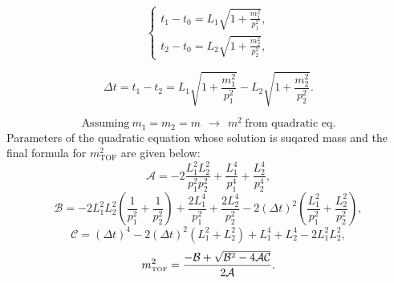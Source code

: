 \begin{equation}
 \left\{\begin{array}{l}%
 t_{1}-t_{0} = L_{1}\sqrt{1+\frac{m_{1}^{2}}{p_{1}^{2}}}, \\[3pt]
 t_{2}-t_{0} = L_{2}\sqrt{1+\frac{m_{2}^{2}}{p_{2}^{2}}},
\end{array}\right.%
\end{equation}

\begin{equation}
 \Delta t = t_{1}-t_{2} = L_{1}\sqrt{1+\frac{m_{1}^{2}}{p_{1}^{2}}} - L_{2}\sqrt{1+\frac{m_{2}^{2}}{p_{2}^{2}}}.
\end{equation}

\[\textrm{Assuming}~m_{1}=m_{2}=m~~\rightarrow~~m^{2}~\textrm{from quadratic eq.}\]
Parameters of the quadratic equation whose solution is suqared mass and the final formula for $m^{2}_{\text{TOF}}$ are given below:
\begin{equation}
\mathcal{A}= -2\frac{L^2_1L^2_2}{p^2_1p^2_2}+\frac{L^4_1}{p^4_1}+\frac{L^4_2}{p^4_2},
\end{equation}
\begin{equation}
\mathcal{B}=-2L^2_1L^2_2\left({\frac{1}{p^2_1}} + {\frac{1}{p^2_2}}\right)+\frac{2L^4_1}{p_1^2}+\frac{2L^4_2}{p_2^2}-2\left(\Delta t\right)^2\left(\frac{L^2_1}{p_1^2}+\frac{L^2_2}{p_2^2}\right),
\end{equation}
\begin{equation}
\mathcal{C}=\left(\Delta t\right)^4-2\left(\Delta t\right)^2\left(L^2_1+L^2_2\right)+L^4_1+L^4_2-2L^2_1L^2_2,
\end{equation}
\begin{equation}
 \label{eq:mSquared}
m^{2}_{\textrm{\tiny TOF}} = \frac{-\mathcal{B}+\sqrt{\mathcal{B}^2-4\mathcal{A}\mathcal{C}}}{2\mathcal{A}}.
\end{equation}






